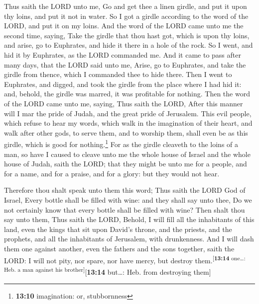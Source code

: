  Thus saith the LORD unto me, Go and get thee a linen
girdle, and put it upon thy loins, and put it not in water.
 So I got a girdle according to the word of the LORD, and
put it on my loins.  And the word of the LORD came unto me
the second time, saying,  Take the girdle that thou hast
got, which is upon thy loins, and arise, go to Euphrates, and hide it
there in a hole of the rock.  So I went, and hid it by
Euphrates, as the LORD commanded me.  And it came to pass
after many days, that the LORD said unto me, Arise, go to Euphrates, and
take the girdle from thence, which I commanded thee to hide there.
 Then I went to Euphrates, and digged, and took the girdle
from the place where I had hid it: and, behold, the girdle was marred,
it was profitable for nothing.  Then the word of the LORD
came unto me, saying,  Thus saith the LORD, After this
manner will I mar the pride of Judah, and the great pride of Jerusalem.
 This evil people, which refuse to hear my words, which
walk in the imagination of their heart, and walk after other gods, to
serve them, and to worship them, shall even be as this girdle, which is
good for nothing.\footnote{\textbf{13:10} imagination: or, stubbornness}
 For as the girdle cleaveth to the loins of a man, so
have I caused to cleave unto me the whole house of Israel and the whole
house of Judah, saith the LORD; that they might be unto me for a people,
and for a name, and for a praise, and for a glory: but they would not
hear.

 Therefore thou shalt speak unto them this word; Thus
saith the LORD God of Israel, Every bottle shall be filled with wine:
and they shall say unto thee, Do we not certainly know that every bottle
shall be filled with wine?  Then shalt thou say unto
them, Thus saith the LORD, Behold, I will fill all the inhabitants of
this land, even the kings that sit upon David's throne, and the priests,
and the prophets, and all the inhabitants of Jerusalem, with
drunkenness.  And I will dash them one against another,
even the fathers and the sons together, saith the LORD: I will not pity,
nor spare, nor have mercy, but destroy
them.\textsuperscript{{[}\textbf{13:14} one\ldots: Heb. a man against
his brother{]}}{[}\textbf{13:14} but\ldots: Heb. from destroying them{]}

